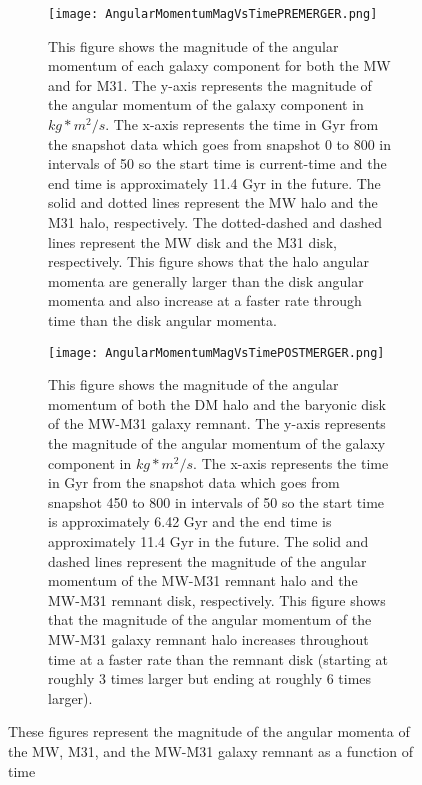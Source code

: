\documentclass[fleqn,usenatbib]{mnras}
\begin{document}
\begin{figure}
\centering
\begin{subfigure}[b]{0.5\textwidth}
    \centering
    \texttt{[image: AngularMomentumMagVsTimePREMERGER.png]}
    \caption{This figure shows the magnitude of the angular momentum of each galaxy component for both the MW and for M31. The y-axis represents the magnitude of the angular momentum of the galaxy component in $kg*m^2/s$. The x-axis represents the time in Gyr from the snapshot data which goes from snapshot 0 to 800 in intervals of 50 so the start time is current-time and the end time is approximately 11.4 Gyr in the future. The solid and dotted lines represent the MW halo and the M31 halo, respectively. The dotted-dashed and dashed lines represent the MW disk and the M31 disk, respectively. This figure shows that the halo angular momenta are generally larger than the disk angular momenta and also increase at a faster rate through time than the disk angular momenta.}
    \label{fig:AMMpre}
\end{subfigure}
\begin{subfigure}[b]{0.5\textwidth}              
    \centering
    \texttt{[image: AngularMomentumMagVsTimePOSTMERGER.png]}
    \caption{This figure shows the magnitude of the angular momentum of both the DM halo and the baryonic disk of the MW-M31 galaxy remnant. The y-axis represents the magnitude of the angular momentum of the galaxy component in $kg*m^2/s$. The x-axis represents the time in Gyr from the snapshot data which goes from snapshot 450 to 800 in intervals of 50 so the start time is approximately 6.42 Gyr and the end time is approximately 11.4 Gyr in the future. The solid and dashed lines represent the magnitude of the angular momentum of the MW-M31 remnant halo and the MW-M31 remnant disk, respectively. This figure shows that the magnitude of the angular momentum of the MW-M31 galaxy remnant halo increases throughout time at a faster rate than the remnant disk (starting at roughly 3 times larger but ending at roughly 6 times larger).}
    \label{fig:AMMpost}
\end{subfigure}
\caption{These figures represent the magnitude of the angular momenta of the MW, M31, and the MW-M31 galaxy remnant as a function of time}
\end{figure}
\end{document}
